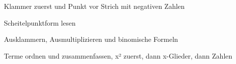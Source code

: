 \begin{aufgabe}{Klammer zuerst und Punkt vor Strich mit negativen Zahlen}
\end{aufgabe}

\begin{aufgabe}{Scheitelpunktform lesen}
\end{aufgabe}

\begin{aufgabe}{Ausklammern, Ausmultiplizieren und binomische Formeln}
\end{aufgabe}

\begin{aufgabe}{Terme ordnen und zusammenfassen, x² zuerst, dann x-Glieder, dann Zahlen}
\end{aufgabe}

